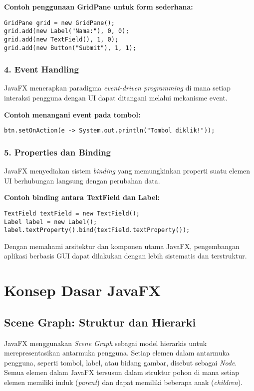 \textbf{Contoh penggunaan GridPane untuk form sederhana:}
\begin{lstlisting}[style=JavaStyle, caption=Contoh GridPane dalam JavaFX]
GridPane grid = new GridPane();
grid.add(new Label("Nama:"), 0, 0);
grid.add(new TextField(), 1, 0);
grid.add(new Button("Submit"), 1, 1);
\end{lstlisting}

\subsubsection{4. Event Handling}
JavaFX menerapkan paradigma \textit{event-driven programming} di mana setiap interaksi pengguna dengan UI dapat ditangani melalui mekanisme event.

\textbf{Contoh menangani event pada tombol:}
\begin{lstlisting}[style=JavaStyle, caption=Menangani event klik tombol di JavaFX]
btn.setOnAction(e -> System.out.println("Tombol diklik!"));
\end{lstlisting}

\subsubsection{5. Properties dan Binding}
JavaFX menyediakan sistem \textit{binding} yang memungkinkan properti suatu elemen UI berhubungan langsung dengan perubahan data.

\textbf{Contoh binding antara TextField dan Label:}
\begin{lstlisting}[style=JavaStyle, caption=Contoh binding dalam JavaFX]
TextField textField = new TextField();
Label label = new Label();
label.textProperty().bind(textField.textProperty());
\end{lstlisting}

Dengan memahami arsitektur dan komponen utama JavaFX, pengembangan aplikasi berbasis GUI dapat dilakukan dengan lebih sistematis dan terstruktur.


\section{Konsep Dasar JavaFX}

\subsection{Scene Graph: Struktur dan Hierarki}

JavaFX menggunakan \textit{Scene Graph} sebagai model hierarkis untuk merepresentasikan antarmuka pengguna. Setiap elemen dalam antarmuka pengguna, seperti tombol, label, atau bidang gambar, disebut sebagai \textit{Node}. Semua elemen dalam JavaFX tersusun dalam struktur pohon di mana setiap elemen memiliki induk (\textit{parent}) dan dapat memiliki beberapa anak (\textit{children}).

